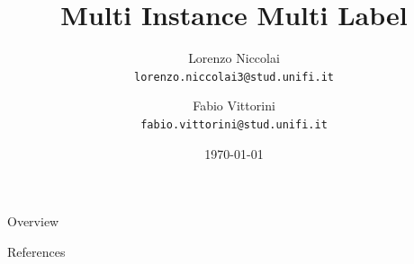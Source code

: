 \documentclass{beamer}
\title[MIML]{Multi Instance Multi Label}
\institute[]{{\large Machine Learning}\\\vspace{0.3cm}\textit{University of Florence, Department of Information Engineering}}
\author[L. Niccolai, F. Vittorini]
{\parbox[c]{1.5in}{Lorenzo Niccolai\\\texttt{\tiny lorenzo.niccolai3@stud.unifi.it}} \and 
\parbox[c]{1.5in}{Fabio Vittorini\\\texttt{\tiny fabio.vittorini@stud.unifi.it}}}
\date{\today}
\begin{document}
	
	
\frame[plain]{\titlepage} %

\usebackgroundtemplate
{
}



\begin{frame}{Overview}
	\tableofcontents
\end{frame}







\begin{frame}{References}


\end{frame}
\end{document}
